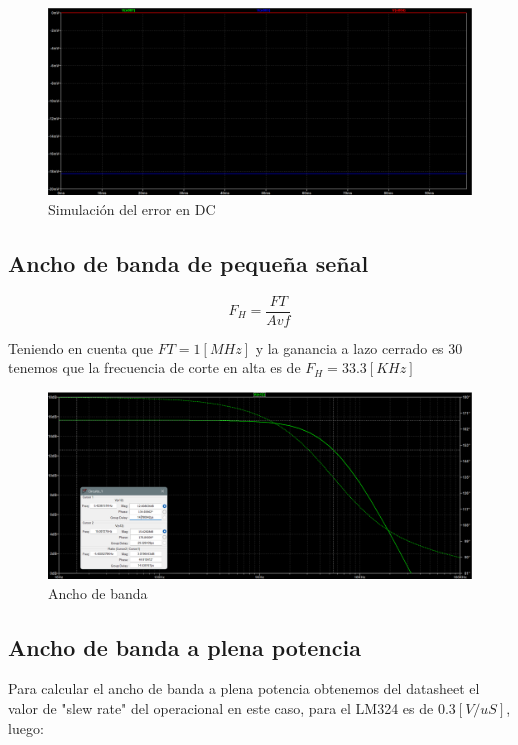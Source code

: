 \documentclass[12pt]{article}
\begin{document}
	\begin{figure}[h!]
		\includegraphics[width=\linewidth]{Imagenes_simulaciones/Sim_Error_DC}
		\caption[Simulación del error en DC]{Simulación del error en DC}
		\label{fig:simerrordc}
	\end{figure}
	
	\subsection{Ancho de banda de pequeña señal}
	
	\begin{equation}
		F_{H}=\frac{FT}{Avf}
	\end{equation}
	
	Teniendo en cuenta que $FT=1[MHz]$ y la ganancia a lazo cerrado es 30 tenemos que la frecuencia de corte en alta es de $F_{H}=33.3[KHz]$
	
	\begin{figure}[h!]
		\includegraphics[width=\linewidth]{Imagenes_simulaciones/Sim_Bode_3db_marcados}
		\caption[Ancho de banda de baja señal]{Ancho de banda}
		\label{fig:simbode3dbmarcados}
	\end{figure}

	\subsection{Ancho de banda a plena potencia}
	Para calcular el ancho de banda a plena potencia obtenemos del datasheet el valor de "slew rate" del operacional en este caso, para el LM324 es de $0.3[V/uS]$, luego:
	
\end{document}
